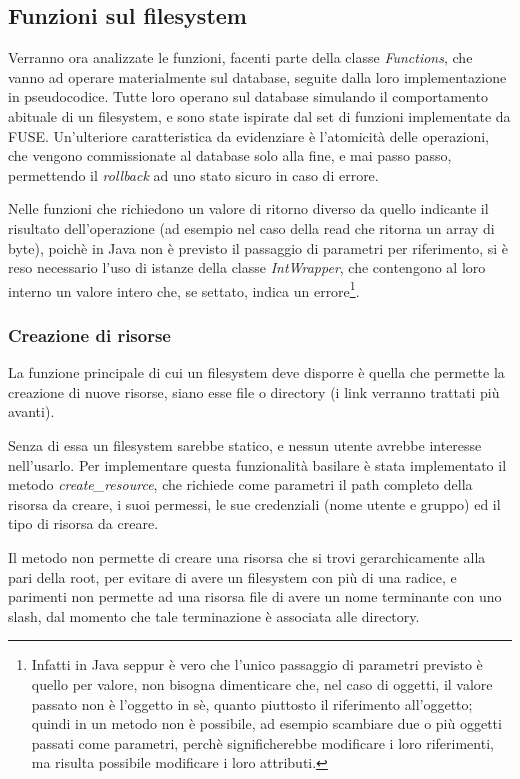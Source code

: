 \subsection{Funzioni sul filesystem}
Verranno ora analizzate le funzioni, facenti parte della classe \emph{Functions}, che vanno ad operare materialmente sul database, seguite dalla loro implementazione in pseudocodice. Tutte loro operano sul database simulando il comportamento abituale di un filesystem, e sono state ispirate dal set di funzioni implementate da FUSE. Un'ulteriore caratteristica da evidenziare è l'atomicità delle operazioni, che vengono commissionate al database solo alla fine, e mai passo passo, permettendo il \emph{rollback} ad uno stato sicuro in caso di errore.

Nelle funzioni che richiedono un valore di ritorno diverso da quello indicante il risultato dell'operazione (ad esempio nel caso della read che ritorna un array di byte), poichè in Java non è previsto il passaggio di parametri per riferimento, si è reso necessario l'uso di istanze della classe \emph{IntWrapper}, che contengono al loro interno un valore intero che, se settato, indica un errore\footnote{Infatti in Java seppur è vero che l'unico passaggio di parametri previsto è quello per valore, non bisogna dimenticare che, nel caso di oggetti, il valore passato non è l'oggetto in sè, quanto piuttosto il riferimento all'oggetto; quindi in un metodo non è possibile, ad esempio scambiare due o più oggetti passati come parametri, perchè significherebbe modificare i loro riferimenti, ma risulta possibile modificare i loro attributi.}.

\subsubsection{Creazione di risorse}
La funzione principale di cui un filesystem deve disporre è quella che permette la creazione di nuove risorse, siano esse file o directory (i link verranno trattati più avanti). 

Senza di essa un filesystem sarebbe statico, e nessun utente avrebbe interesse nell'usarlo. Per implementare questa funzionalità basilare è stata implementato il metodo \emph{create\_resource}, che richiede come parametri il path completo della risorsa da creare, i suoi permessi, le sue credenziali (nome utente e gruppo) ed il tipo di risorsa da creare.

Il metodo non permette di creare una risorsa che si trovi gerarchicamente alla pari della root, per evitare di avere un filesystem con più di una radice, e parimenti non permette ad una risorsa file di avere un nome terminante con uno slash, dal momento che tale terminazione è associata alle directory.

